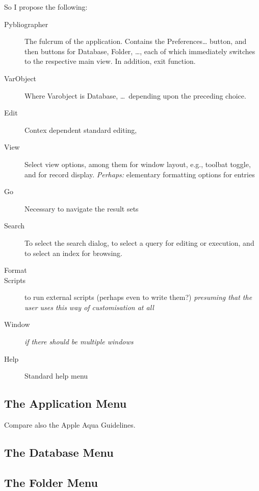 So I propose the following:
\begin{description}
\item[Pybliographer] The fulcrum of the application. Contains the
  \textsf{Preferences\dots} button, and then buttons for
  \textsf{Database}, \textsf{Folder}, \dots , each of which
  immediately switches  to the respective main view. In addition, exit
  function. 
\item[VarObject] Where Varobject is Database, \dots\ depending upon
  the preceding choice.

  
\item[Edit]  Contex dependent standard editing, 
\item[View]  Select view options, among them for window layout, e.g.,
  toolbat toggle, and for record display. \textit{Perhaps:} elementary
  formatting options for entries
\item[Go]  Necessary to navigate the result sets
\item[Search] To select the search dialog, to select a query for
  editing or execution, and to select an index for browsing.
\item[Format] 
\item[Scripts] to run external scripts (perhaps even to write them?)
  \textit{presuming that the user uses this way of customisation at all}
\item[Window] \textit{if there should be multiple windows}
\item[Help] Standard help menu
\end{description}



\subsection{The Application Menu}
\label{sec:guimnappl}

\begin{dnote}
\item  Compare also the Apple  Aqua Guidelines.
\end{dnote}


\subsection{The Database Menu}
\label{sec:guimndb}


\subsection{The Folder Menu}
\label{sec:guimnfold}


